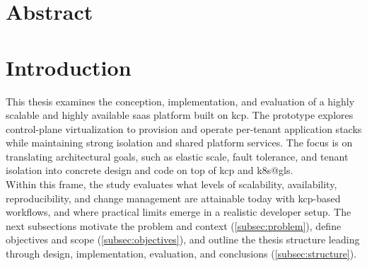 \documentclass[11pt, a4paper, oneside, listof=totoc]{scrartcl}
\begin{document}
    \section*{Abstract}\label{abstract}

    \newpage

    \printglossary[type=\acronymtype, title={Acronyms}]
    \cleardoublepage
    \printglossary[title={Glossary}]


    \cleardoublepage

    \begingroup
        \tableofcontents
    \endgroup

    \newpage

    \cleardoublepage
    \begingroup
        \renewcommand{\addcontentsline}[3]{}
        \listoffigures
    \endgroup

    \cleardoublepage
    \begingroup
        \renewcommand{\addcontentsline}[3]{}
        \listoftables
    \endgroup

    \newpage


    \section{Introduction}\label{sec:introduction}
        This thesis examines the conception, implementation, and evaluation of a highly scalable and
        highly available \gls{saas} platform built on \gls{kcp}.
        The prototype explores control-plane virtualization to provision and operate per-tenant
        application stacks while maintaining strong isolation and shared platform services.
        The focus is on translating architectural goals, such as elastic scale, fault tolerance, and
        tenant isolation into concrete design and code on top of \gls{kcp} and \gls{k8s@gls}.\\
        Within this frame, the study evaluates what levels of scalability, availability,
        reproducibility, and change management are attainable today with \gls{kcp}-based workflows,
        and where practical limits emerge in a realistic developer setup.
        The next subsections motivate the problem and context (\autoref{subsec:problem}), define
        objectives and scope (\autoref{subsec:objectives}), and outline the thesis structure leading
        through design, implementation, evaluation, and conclusions (\autoref{subsec:structure}).
\end{document}
